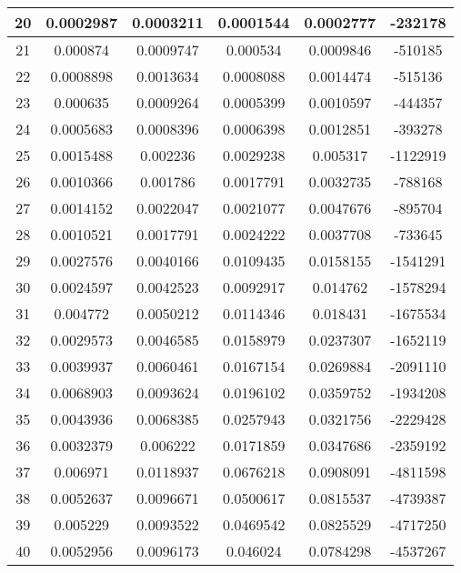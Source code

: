 \begin{longtable}{|c|c|c|c|c|c|}
20    & 0.0002987 & 0.0003211         & 0.0001544  & 0.0002777  & -232178    \\ \hline
21    & 0.000874  & 0.0009747         & 0.000534   & 0.0009846  & -510185    \\ \hline
22    & 0.0008898 & 0.0013634         & 0.0008088  & 0.0014474  & -515136    \\ \hline
23    & 0.000635  & 0.0009264         & 0.0005399  & 0.0010597  & -444357    \\ \hline
24    & 0.0005683 & 0.0008396         & 0.0006398  & 0.0012851  & -393278    \\ \hline
25    & 0.0015488 & 0.002236          & 0.0029238  & 0.005317   & -1122919   \\ \hline
26    & 0.0010366 & 0.001786          & 0.0017791  & 0.0032735  & -788168    \\ \hline
27    & 0.0014152 & 0.0022047         & 0.0021077  & 0.0047676  & -895704    \\ \hline
28    & 0.0010521 & 0.0017791         & 0.0024222  & 0.0037708  & -733645    \\ \hline
29    & 0.0027576 & 0.0040166         & 0.0109435  & 0.0158155  & -1541291   \\ \hline
30    & 0.0024597 & 0.0042523         & 0.0092917  & 0.014762   & -1578294   \\ \hline
31    & 0.004772  & 0.0050212         & 0.0114346  & 0.018431   & -1675534   \\ \hline
32    & 0.0029573 & 0.0046585         & 0.0158979  & 0.0237307  & -1652119   \\ \hline
33    & 0.0039937 & 0.0060461         & 0.0167154  & 0.0269884  & -2091110   \\ \hline
34    & 0.0068903 & 0.0093624         & 0.0196102  & 0.0359752  & -1934208   \\ \hline
35    & 0.0043936 & 0.0068385         & 0.0257943  & 0.0321756  & -2229428   \\ \hline
36    & 0.0032379 & 0.006222          & 0.0171859  & 0.0347686  & -2359192   \\ \hline
37    & 0.006971  & 0.0118937         & 0.0676218  & 0.0908091  & -4811598   \\ \hline
38    & 0.0052637 & 0.0096671         & 0.0500617  & 0.0815537  & -4739387   \\ \hline
39    & 0.005229  & 0.0093522         & 0.0469542  & 0.0825529  & -4717250   \\ \hline
40    & 0.0052956 & 0.0096173         & 0.046024   & 0.0784298  & -4537267   \\ \hline

\end{longtable}
